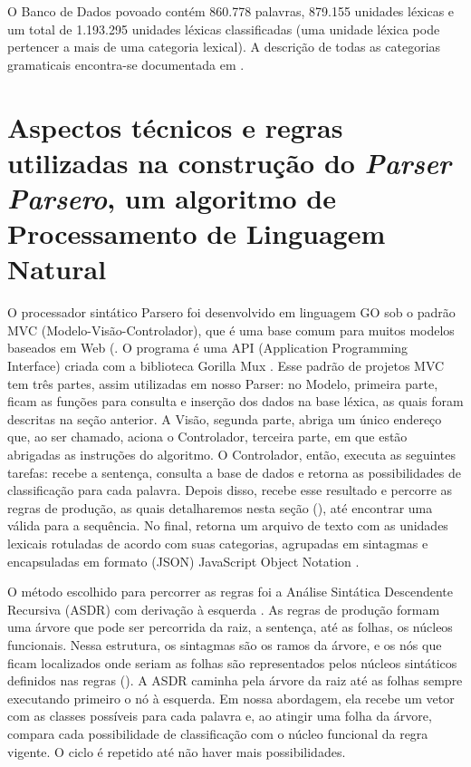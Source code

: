 \documentclass[portuguese]{textolivre}
\begin{document}
O Banco de Dados povoado contém 860.778 palavras, 879.155 unidades léxicas e um total de 1.193.295 unidades léxicas classificadas (uma unidade léxica pode pertencer a mais de uma categoria lexical). A descrição de todas as categorias gramaticais encontra-se documentada em \textcite{pacheco_banco_2021}. 

\section{Aspectos técnicos e regras utilizadas na construção do \textit{Parser Parsero}, um algoritmo de Processamento de Linguagem Natural}\label{sec-formato}
O processador sintático Parsero foi desenvolvido em linguagem GO \cite{the_go_authors_golang_nodate} sob o padrão MVC (Modelo-Visão-Controlador), que é uma base comum para muitos modelos baseados em Web \cite[p. 108]{sommerville_engenharia_2011}(. O programa é uma API (Application Programming Interface) criada com a biblioteca Gorilla Mux \cite{the_gorilla_authors_gorilla_2021}. Esse padrão de projetos MVC tem três partes, assim utilizadas em nosso Parser: no Modelo, primeira parte, ficam as funções para consulta e inserção dos dados na base léxica, as quais foram descritas na seção anterior. A Visão, segunda parte, abriga um único endereço que, ao ser chamado, aciona o Controlador, terceira parte, em que estão abrigadas as instruções do algoritmo. O Controlador, então, executa as seguintes tarefas: recebe a sentença, consulta a base de dados e retorna as possibilidades de classificação para cada palavra. Depois disso, recebe esse resultado e percorre as regras de produção, as quais detalharemos nesta seção (), até encontrar uma válida para a sequência. No final, retorna um arquivo de texto com as unidades lexicais rotuladas de acordo com suas categorias, agrupadas em sintagmas e encapsuladas em formato (JSON) JavaScript Object Notation \cite{ecma-404_internacional_json_2017}.

O método escolhido para percorrer as regras foi a Análise Sintática Descendente Recursiva (ASDR) com derivação à esquerda \cite[p. 37]{thain_introduction_2020}. As regras de produção formam uma árvore que pode ser percorrida da raiz, a sentença, até as folhas, os núcleos funcionais. Nessa estrutura, os sintagmas são os ramos da árvore, e os nós que ficam localizados onde seriam as folhas são representados pelos núcleos sintáticos definidos nas regras (). A ASDR caminha pela árvore da raiz até as folhas sempre executando primeiro o nó à esquerda. Em nossa abordagem, ela recebe um vetor com as classes possíveis para cada palavra e, ao atingir uma folha da árvore, compara cada possibilidade de classificação com o núcleo funcional da regra vigente. O ciclo é repetido até não haver mais possibilidades. 
\end{document}
